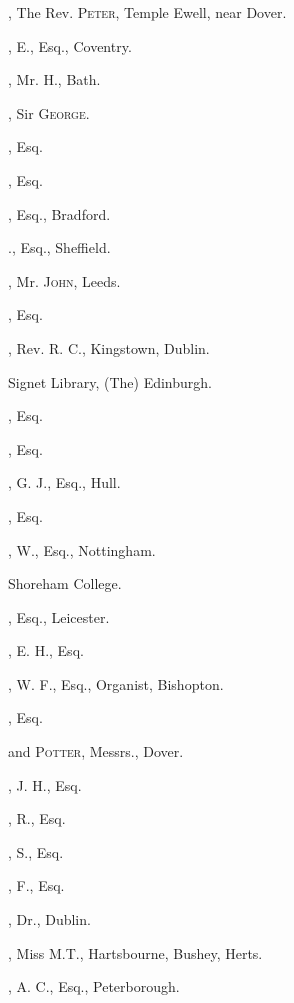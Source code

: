  
\begin{multicols}{2}\small
\setlength{\parindent}{0em}
\setlength{\parskip}{0em}
\raggedright

, The Rev. \textsc{Peter}, Temple Ewell,
near Dover.

, E., Esq., Coventry.

, Mr. H., Bath.

, Sir \textsc{George}.

, Esq.

, Esq.

, Esq., Bradford.

., Esq., Sheffield.

, Mr. \textsc{John}, Leeds.

, Esq.

, Rev. R. C., Kingstown, Dublin.

Signet Library, (The) Edinburgh.

, Esq.

, Esq.

, G. J., Esq., Hull.

, Esq.

, W., Esq., Nottingham.

Shoreham College.

, Esq., Leicester.

, E. H., Esq.

, W. F., Esq., Organist, Bishopton.

, Esq.

 and \textsc{Potter}, Messrs., Dover.

, J. H., Esq.

, R., Esq.

, S., Esq.

, F., Esq.

, Dr., Dublin.
\bigskip

, Miss M.T., Hartsbourne, Bushey,
Herts.

, A. C., Esq., Peterborough.


\end{multicols}
